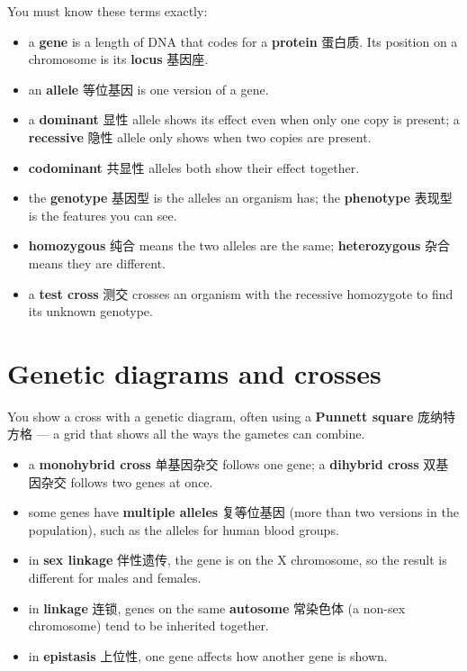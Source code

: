 \documentclass[11pt]{article}
\begin{document}
You must know these terms exactly:

\begin{itemize}
\item a \textbf{gene} is a length of DNA that codes for a \textbf{protein} 蛋白质. Its position on a chromosome is its \textbf{locus} 基因座.

\item an \textbf{allele} 等位基因 is one version of a gene.

\item a \textbf{dominant} 显性 allele shows its effect even when only one copy is present; a \textbf{recessive} 隐性 allele only shows when two copies are present.

\item \textbf{codominant} 共显性 alleles both show their effect together.

\item the \textbf{genotype} 基因型 is the alleles an organism has; the \textbf{phenotype} 表现型 is the features you can see.

\item \textbf{homozygous} 纯合 means the two alleles are the same; \textbf{heterozygous} 杂合 means they are different.

\item a \textbf{test cross} 测交 crosses an organism with the recessive homozygote to find its unknown genotype.

\end{itemize}

\section*{Genetic diagrams and crosses}

You show a cross with a genetic diagram, often using a \textbf{Punnett square} 庞纳特方格 — a grid that shows all the ways the gametes can combine.

\begin{itemize}
\item a \textbf{monohybrid cross} 单基因杂交 follows one gene; a \textbf{dihybrid cross} 双基因杂交 follows two genes at once.

\item some genes have \textbf{multiple alleles} 复等位基因 (more than two versions in the population), such as the alleles for human blood groups.

\item in \textbf{sex linkage} 伴性遗传, the gene is on the X chromosome, so the result is different for males and females.

\item in \textbf{linkage} 连锁, genes on the same \textbf{autosome} 常染色体 (a non-sex chromosome) tend to be inherited together.

\item in \textbf{epistasis} 上位性, one gene affects how another gene is shown.

\end{itemize}
\end{document}
